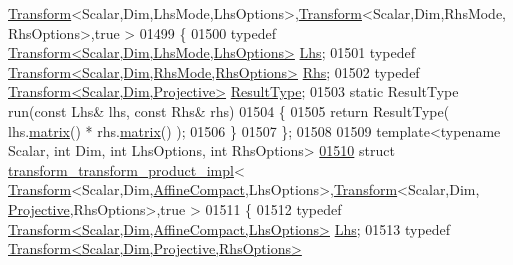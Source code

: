 \begin{DoxyCode}
      \hyperlink{group___geometry___module_class_eigen_1_1_transform}{Transform}<Scalar,Dim,LhsMode,LhsOptions>,\hyperlink{group___geometry___module_class_eigen_1_1_transform}{Transform}<Scalar,Dim,RhsMode,RhsOptions>,true >
01499 \{
01500   \textcolor{keyword}{typedef} \hyperlink{group___geometry___module_class_eigen_1_1_transform}{Transform<Scalar,Dim,LhsMode,LhsOptions>} 
      \hyperlink{group___geometry___module_class_eigen_1_1_transform}{Lhs};
01501   \textcolor{keyword}{typedef} \hyperlink{group___geometry___module_class_eigen_1_1_transform}{Transform<Scalar,Dim,RhsMode,RhsOptions>} 
      \hyperlink{group___geometry___module_class_eigen_1_1_transform}{Rhs};
01502   \textcolor{keyword}{typedef} \hyperlink{group___geometry___module_class_eigen_1_1_transform}{Transform<Scalar,Dim,Projective>} 
      \hyperlink{group___geometry___module_class_eigen_1_1_transform}{ResultType};
01503   \textcolor{keyword}{static} ResultType run(\textcolor{keyword}{const} Lhs& lhs, \textcolor{keyword}{const} Rhs& rhs)
01504   \{
01505     \textcolor{keywordflow}{return} ResultType( lhs.\hyperlink{group___geometry___module_aec8168000a88a807130d41020af98d47}{matrix}() * rhs.\hyperlink{group___geometry___module_aec8168000a88a807130d41020af98d47}{matrix}() );
01506   \}
01507 \};
01508 
01509 \textcolor{keyword}{template}<\textcolor{keyword}{typename} Scalar, \textcolor{keywordtype}{int} Dim, \textcolor{keywordtype}{int} LhsOptions, \textcolor{keywordtype}{int} RhsOptions>
\hyperlink{struct_eigen_1_1internal_1_1transform__transform__product__impl_3_01_transform_3_01_scalar_00_013384ded452302af9ec99c76aff6d09ab}{01510} \textcolor{keyword}{struct }\hyperlink{struct_eigen_1_1internal_1_1transform__transform__product__impl}{transform\_transform\_product\_impl}<
      \hyperlink{group___geometry___module_class_eigen_1_1_transform}{Transform}<Scalar,Dim,\hyperlink{group__enums_ggaee59a86102f150923b0cac6d4ff05107aa30a06b60d218b709020972df47de2b0}{AffineCompact},LhsOptions>,\hyperlink{group___geometry___module_class_eigen_1_1_transform}{Transform}<Scalar,Dim,
      \hyperlink{group__enums_ggaee59a86102f150923b0cac6d4ff05107aead6a2de12a17aaa4f5c523215dfccad}{Projective},RhsOptions>,true >
01511 \{
01512   \textcolor{keyword}{typedef} \hyperlink{group___geometry___module_class_eigen_1_1_transform}{Transform<Scalar,Dim,AffineCompact,LhsOptions>} 
      \hyperlink{group___geometry___module_class_eigen_1_1_transform}{Lhs};
01513   \textcolor{keyword}{typedef} \hyperlink{group___geometry___module_class_eigen_1_1_transform}{Transform<Scalar,Dim,Projective,RhsOptions>} 

\end{DoxyCode}
